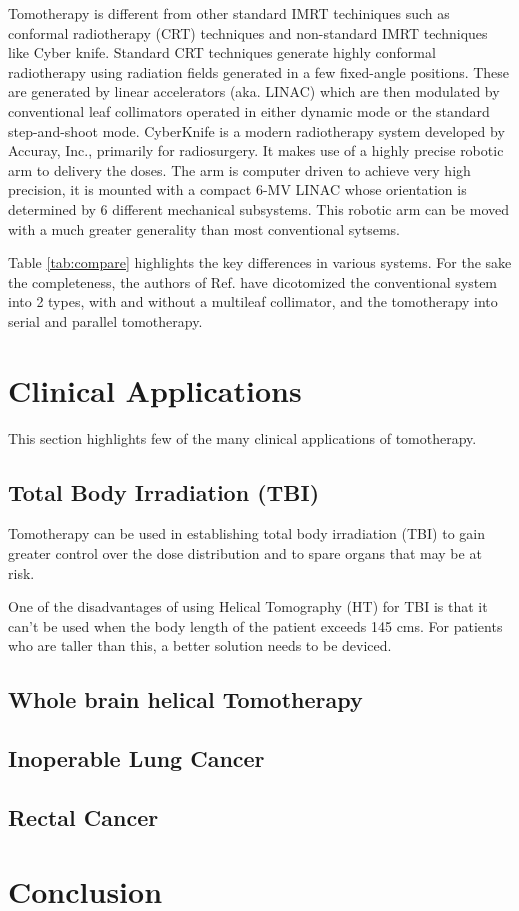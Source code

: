 \documentclass[10pt,journal,compsoc]{IEEEtran} %
\begin{document}
  Tomotherapy is different from other standard IMRT techiniques such as 
  conformal radiotherapy (CRT) techniques and non-standard IMRT techniques like 
  Cyber knife.   Standard CRT techniques generate highly conformal radiotherapy 
  using radiation fields generated in a few fixed-angle positions. These are 
  generated by linear accelerators (aka. LINAC) which are then modulated by 
  conventional leaf collimators operated in either dynamic mode or the standard 
  step-and-shoot mode. CyberKnife is a modern radiotherapy system developed by 
  Accuray, Inc., primarily for radiosurgery. It makes use of a highly precise 
  robotic arm to delivery the doses. The arm is computer driven to achieve very 
  high precision, it is mounted with a compact 6-MV LINAC whose orientation is 
  determined by 6 different mechanical subsystems. This robotic arm can be 
  moved with a much greater generality than most conventional sytsems. 
  
  Table \ref{tab:compare} highlights the key differences in various systems. 
  For the 
  sake the completeness, the authors of Ref. \cite{Fenwick2006} have 
  dicotomized the conventional system into 2 types, with and without a 
  multileaf collimator, and the tomotherapy into serial and parallel 
  tomotherapy.
  \section{Clinical Applications}
  \label{clinical}
  This section highlights few of the many clinical applications of tomotherapy. 
  \subsection{Total Body Irradiation (TBI)}
  Tomotherapy can be used in establishing total body irradiation (TBI) to gain 
  greater control over the dose distribution and to spare organs that may be at 
  risk.
  
  One of the disadvantages of using Helical Tomography (HT) for TBI is that it 
  can't be used when the body length of the patient exceeds 145 cms. For 
  patients who are taller than this, a better solution needs to be deviced.
  \subsection{Whole brain helical Tomotherapy}
  \subsection{Inoperable Lung Cancer}
  \subsection{Rectal Cancer}
  \section{Conclusion}
  \label{conclusions}
  {}
  
  
\end{document}
